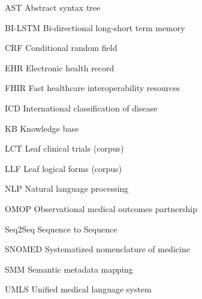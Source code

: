 \documentclass[../main.tex]{subfiles}
\begin{document}
\begin{glossary}
\item[AST] Abstract syntax tree
\item[BI-LSTM] Bi-directional long-short term memory
\item[CRF] Conditional random field
\item[EHR] Electronic health record
\item[FHIR] Fast healthcare interoperability resources
\item[ICD] International classification of disease
\item[KB] Knowledge base
\item[LCT] Leaf clinical trials (corpus)
\item[LLF] Leaf logical forms (corpus)
\item[NLP] Natural language processing
\item[OMOP] Observational medical outcomes partnership
\item[Seq2Seq] Sequence to Sequence
\item[SNOMED] Systematized nomenclature of medicine
\item[SMM] Semantic metadata mapping
\item[UMLS] Unified medical language system
 
\end{glossary}
\end{document}
